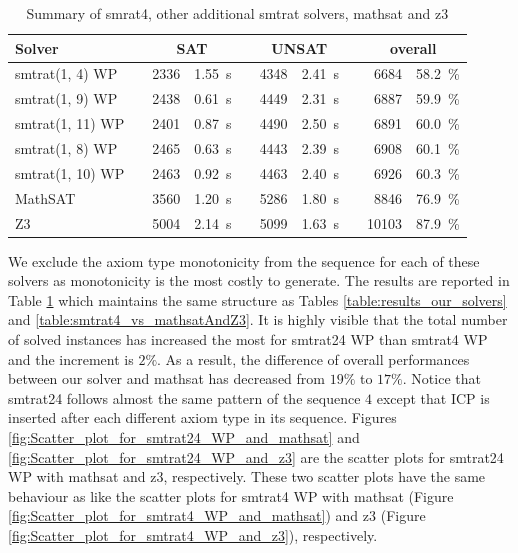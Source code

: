 \begin{table}[!ht]
\caption{Summary of smrat4, other additional smtrat solvers, mathsat and z3}
\begin{tabularx}{\textwidth}{lXrrXrrXrr}
	\toprule
	\textbf{Solver}
	&& \multicolumn{2}{c}{\textbf{SAT}}
	&& \multicolumn{2}{c}{\textbf{UNSAT}}
	&& \multicolumn{2}{c}{\textbf{overall}}
	\\
	\midrule
	smtrat(1, 4) WP
	&& 2336 & 1.55~s
	&& 4348 & 2.41~s
	&& 6684 & 58.2~\%
	\\
	smtrat(1, 9) WP
	&& 2438 & 0.61~s
	&& 4449 & 2.31~s
	&& 6887 & 59.9~\%
	\\
	smtrat(1, 11) WP
	&& 2401 & 0.87~s
	&& 4490 & 2.50~s
	&& 6891 & 60.0~\%
	\\
	smtrat(1, 8) WP
	&& 2465 & 0.63~s
	&& 4443 & 2.39~s
	&& 6908 & 60.1~\%
	\\
	smtrat(1, 10) WP
	&& 2463 & 0.92~s
	&& 4463 & 2.40~s
	&& 6926 & 60.3~\%
	\\
	MathSAT
    	&& 3560 & 1.20~s
     	&& 5286 & 1.80~s
     	&& 8846 & 76.9~\%
	\\
	Z3
	&& 5004 & 2.14~s
	&& 5099 & 1.63~s
	&& 10103 & 87.9~\%
	\\
	\bottomrule
\end{tabularx}
\label{table:Summary_of_smrat4_and_other_additional_smtrat_solvers}
\end{table}

\noindent We exclude the axiom type monotonicity from the sequence for each of these solvers as monotonicity is the most costly to generate.
The results are reported in Table \ref{table:Summary_of_smrat4_and_other_additional_smtrat_solvers} which maintains the same structure as Tables \ref{table:results_our_solvers} and \ref{table:smtrat4_vs_mathsatAndZ3}.
It is highly visible that the total number of solved instances has increased the most for smtrat24 WP than smtrat4 WP and the increment is $2\%$.
As a result, the difference of overall performances between our solver and mathsat has decreased from $19\%$ to $17\%$.
Notice that smtrat24 follows almost the same pattern of the sequence $4$ except that ICP is inserted after each different axiom type in its sequence.
Figures \ref{fig:Scatter_plot_for_smtrat24_WP_and_mathsat} and \ref{fig:Scatter_plot_for_smtrat24_WP_and_z3} are the scatter plots for smtrat24 WP with mathsat and z3, respectively.
These two scatter plots have the same behaviour as like the scatter plots for smtrat4 WP with mathsat (Figure \ref{fig:Scatter_plot_for_smtrat4_WP_and_mathsat}) and z3 (Figure \ref{fig:Scatter_plot_for_smtrat4_WP_and_z3}), respectively.\newline

